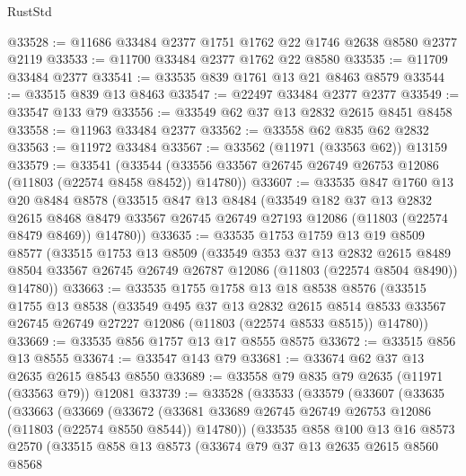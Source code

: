 \begin{lexlean}{RustStd}
\begin{coremodule}
@33528 := @11686 @33484 @2377 @1751 @1762 @22 @1746 @2638 @8580 @2377 @2119
@33533 := @11700 @33484 @2377 @1762 @22 @8580
@33535 := @11709 @33484 @2377
@33541 := @33535 @839 @1761 @13 @21 @8463 @8579
@33544 := @33515 @839 @13 @8463
@33547 := @22497 @33484 @2377 @2377
@33549 := @33547 @133 @79
@33556 := @33549 @62 @37 @13 @2832 @2615 @8451 @8458
@33558 := @11963 @33484 @2377
@33562 := @33558 @62 @835 @62 @2832
@33563 := @11972 @33484
@33567 := @33562 (@11971 (@33563 @62)) @13159
@33579 := @33541
    (@33544 (@33556 @33567 @26745 @26749 @26753 @12086 (@11803 (@22574 @8458 @8452)) @14780))
@33607 := @33535
    @847
    @1760
    @13
    @20
    @8484
    @8578
    (@33515
      @847
      @13
      @8484
      (@33549
        @182
        @37
        @13
        @2832
        @2615
        @8468
        @8479
        @33567
        @26745
        @26749
        @27193
        @12086
        (@11803 (@22574 @8479 @8469))
        @14780))
@33635 := @33535
    @1753
    @1759
    @13
    @19
    @8509
    @8577
    (@33515
      @1753
      @13
      @8509
      (@33549
        @353
        @37
        @13
        @2832
        @2615
        @8489
        @8504
        @33567
        @26745
        @26749
        @26787
        @12086
        (@11803 (@22574 @8504 @8490))
        @14780))
@33663 := @33535
    @1755
    @1758
    @13
    @18
    @8538
    @8576
    (@33515
      @1755
      @13
      @8538
      (@33549
        @495
        @37
        @13
        @2832
        @2615
        @8514
        @8533
        @33567
        @26745
        @26749
        @27227
        @12086
        (@11803 (@22574 @8533 @8515))
        @14780))
@33669 := @33535 @856 @1757 @13 @17 @8555 @8575
@33672 := @33515 @856 @13 @8555
@33674 := @33547 @143 @79
@33681 := @33674 @62 @37 @13 @2635 @2615 @8543 @8550
@33689 := @33558 @79 @835 @79 @2635 (@11971 (@33563 @79)) @12081
@33739 := @33528
    (@33533
      (@33579
        (@33607
          (@33635
            (@33663
              (@33669
                (@33672
                  (@33681 @33689 @26745 @26749 @26753 @12086 (@11803 (@22574 @8550 @8544)) @14780))
                (@33535
                  @858
                  @100
                  @13
                  @16
                  @8573
                  @2570
                  (@33515
                    @858
                    @13
                    @8573
                    (@33674
                      @79
                      @37
                      @13
                      @2635
                      @2615
                      @8560
                      @8568

\end{coremodule}
\end{lexlean}
